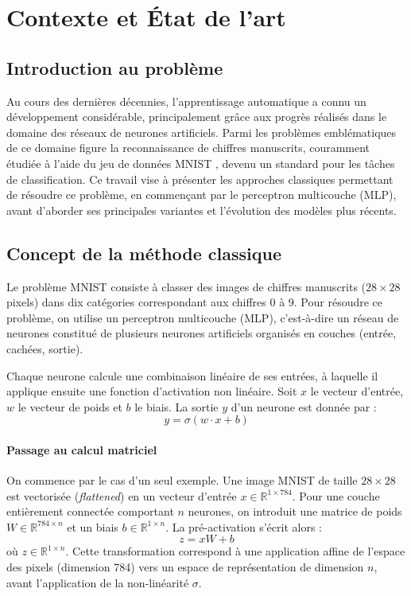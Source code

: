 \documentclass[a4paper,11pt]{article}
\begin{document}
\clearpage

\section{Contexte et État de l'art}

\subsection{Introduction au problème}
Au cours des dernières décennies, l'apprentissage automatique a connu un développement considérable, principalement grâce aux progrès réalisés dans le domaine des réseaux de neurones artificiels. Parmi les problèmes emblématiques de ce domaine figure la reconnaissance de chiffres manuscrits, couramment étudiée à l'aide du jeu de données MNIST \cite{lecun1998}, devenu un standard pour les tâches de classification. Ce travail vise à présenter les approches classiques permettant de résoudre ce problème, en commençant par le perceptron multicouche (MLP), avant d'aborder ses principales variantes et l'évolution des modèles plus récents.

\subsection{Concept de la méthode classique}
Le problème MNIST consiste à classer des images de chiffres manuscrits ($28 \times 28$ pixels) dans dix catégories correspondant aux chiffres 0 à 9. Pour résoudre ce problème, on utilise un perceptron multicouche (MLP), c'est-à-dire un réseau de neurones constitué de plusieurs neurones artificiels organisés en couches (entrée, cachées, sortie).

Chaque neurone calcule une combinaison linéaire de ses entrées, à laquelle il applique ensuite une fonction d'activation non linéaire.
Soit $x$ le vecteur d'entrée, $w$ le vecteur de poids et $b$ le biais. La sortie $y$ d'un neurone est donnée par :
\[ y = \sigma(w \cdot x + b) \]

\paragraph{Passage au calcul matriciel}
On commence par le cas d'un seul exemple. Une image MNIST de taille $28\times 28$ est vectorisée (\textit{flattened}) en un vecteur d'entrée $x\in\mathbb{R}^{1\times 784}$. Pour une couche entièrement connectée comportant $n$ neurones, on introduit une matrice de poids $W\in\mathbb{R}^{784\times n}$ et un biais $b\in\mathbb{R}^{1\times n}$. La pré-activation s'écrit alors :
\[ z = xW + b \]
où $z\in\mathbb{R}^{1\times n}$. Cette transformation correspond à une application affine de l'espace des pixels (dimension 784) vers un espace de représentation de dimension $n$, avant l'application de la non-linéarité $\sigma$.
\end{document}
